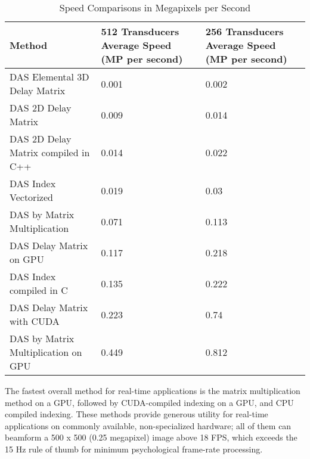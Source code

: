 \begin{table}[!ht]
    \caption{Speed Comparisons in Megapixels per Second}
    \centering
    \begin{tabular}{|p{2in}|M{1.8in}|M{1.8in}|}
        \hline
        Method & 512 Transducers Average Speed (MP per second) & 256 Transducers Average Speed (MP per second) \\ \hline
        DAS Elemental 3D Delay Matrix & 0.001 & 0.002 \\ \hline
        DAS 2D Delay Matrix & 0.009 & 0.014 \\ \hline
        DAS 2D Delay Matrix compiled in C++ & 0.014 & 0.022 \\ \hline
        DAS Index Vectorized & 0.019 & 0.03 \\ \hline
        DAS by Matrix Multiplication & 0.071 & 0.113 \\ \hline
        DAS Delay Matrix on GPU & 0.117 & 0.218 \\ \hline
        DAS Index compiled in C & 0.135 & 0.222 \\ \hline
        DAS Delay Matrix with CUDA & 0.223 & 0.74 \\ \hline
        DAS by Matrix Multiplication on GPU & 0.449 & 0.812 \\ \hline
    \end{tabular}
\end{table}

The fastest overall method for real-time applications is the matrix multiplication method on a GPU, followed by CUDA-compiled indexing on a GPU, and CPU compiled indexing. These methods provide generous utility for real-time applications on commonly available, non-specialized hardware; all of them can beamform a 500 x 500 (0.25 megapixel) image above 18 FPS, which exceeds the 15 Hz rule of thumb for minimum psychological frame-rate processing\cite{chenReviewLowFrame2007}.

\newpage
